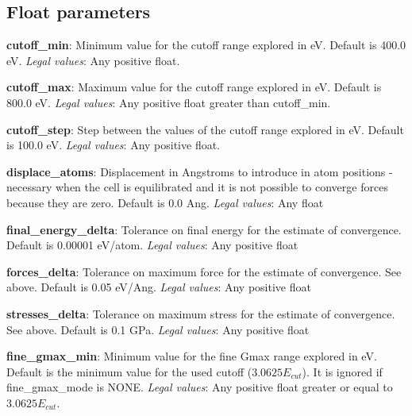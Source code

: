 \documentclass[10pt]{article}
\begin{document}
\subsection{Float parameters}

\textbf{cutoff\_min}: Minimum value for the cutoff range explored in eV. Default 
is 400.0 eV.\newline
\textit{Legal values}: Any positive float.\newline

\textbf{cutoff\_max}: Maximum value for the cutoff range explored in eV. Default 
is 800.0 eV.\newline
\textit{Legal values}: Any positive float greater than cutoff\_min.\newline

\textbf{cutoff\_step}: Step between the values of the cutoff range explored in 
eV. Default is 100.0 eV.\newline
\textit{Legal values}: Any positive float.\newline

\textbf{displace\_atoms}: Displacement in Angstroms to introduce in atom 
positions - necessary when the cell is equilibrated and it is not possible to 
converge forces because they are zero. Default is 0.0 Ang.\newline
\textit{Legal values}: Any float\newline

\textbf{final\_energy\_delta}: Tolerance on final energy for the estimate of 
convergence. Default is 0.00001 eV/atom.\newline
\textit{Legal values}: Any positive float\newline

\textbf{forces\_delta}: Tolerance on maximum force for the estimate of 
convergence. See above. Default is 0.05 eV/Ang.\newline
\textit{Legal values}: Any positive float\newline

\textbf{stresses\_delta}: Tolerance on maximum stress for the estimate of 
convergence. See above. Default is 0.1 GPa.\newline
\textit{Legal values}: Any positive float\newline

\textbf{fine\_gmax\_min}: Minimum value for the fine Gmax range explored in eV. Default 
is the minimum value for the used cutoff ($3.0625E_{cut}$). It is ignored if fine\_gmax\_mode is NONE.\newline
\textit{Legal values}: Any positive float greater or equal to $3.0625E_{cut}$.\newline
\end{document}
